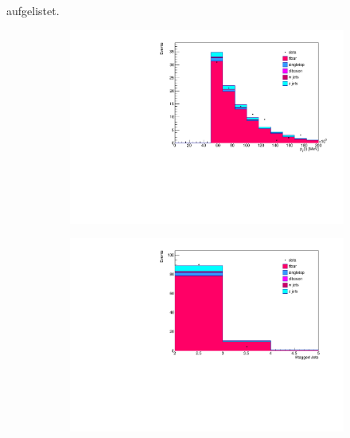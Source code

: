 aufgelistet.

\begin{figure}[H]
  \begin{subfigure}{0.5\textwidth}
    \centering
    \includegraphics[width=\linewidth]{plots_and_txt/stacked_plots/stacked_lep_pt.pdf}
    \caption{}
    \label{fig:stacked_lep_pt}
  \end{subfigure}%
  \begin{subfigure}{0.5\textwidth}
    \centering
    \includegraphics[width=\linewidth]{plots_and_txt/stacked_plots/stacked_btagged.pdf}
    \caption{}
    \label{fig:stacked_btagged}
  \end{subfigure}%
  \newline
  \begin{subfigure}{0.5\textwidth}
    \centering

\end{subfigure}
\end{figure}
